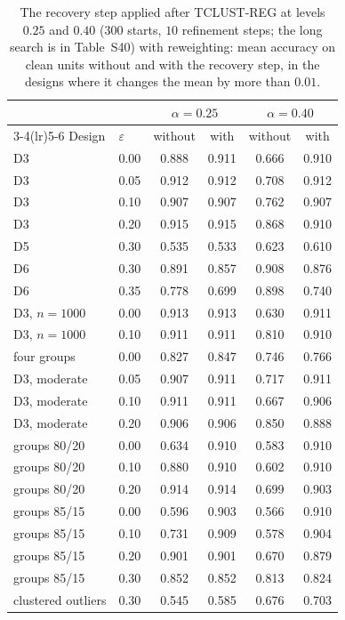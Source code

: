 \begin{table}[htbp]
\centering
\small
\caption{The recovery step applied after TCLUST-REG at levels $0.25$ and $0.40$ ($300$ starts, $10$ refinement steps; the long search is in Table~S40) with reweighting: mean accuracy on clean units without and with the recovery step, in the designs where it changes the mean by more than $0.01$.}
\label{tab:S17}
\begin{tabular}{llcccc}
\toprule
 & & \multicolumn{2}{c}{$\alpha=0.25$} & \multicolumn{2}{c}{$\alpha=0.40$} \\
\cmidrule(lr){3-4}\cmidrule(lr){5-6}
Design & $\varepsilon$ & without & with & without & with \\
\midrule
D3 & 0.00 & 0.888 & 0.911 & 0.666 & 0.910 \\
D3 & 0.05 & 0.912 & 0.912 & 0.708 & 0.912 \\
D3 & 0.10 & 0.907 & 0.907 & 0.762 & 0.907 \\
D3 & 0.20 & 0.915 & 0.915 & 0.868 & 0.910 \\
D5 & 0.30 & 0.535 & 0.533 & 0.623 & 0.610 \\
D6 & 0.30 & 0.891 & 0.857 & 0.908 & 0.876 \\
D6 & 0.35 & 0.778 & 0.699 & 0.898 & 0.740 \\
D3, $n=1000$ & 0.00 & 0.913 & 0.913 & 0.630 & 0.911 \\
D3, $n=1000$ & 0.10 & 0.911 & 0.911 & 0.810 & 0.910 \\
four groups & 0.00 & 0.827 & 0.847 & 0.746 & 0.766 \\
D3, moderate & 0.05 & 0.907 & 0.911 & 0.717 & 0.911 \\
D3, moderate & 0.10 & 0.911 & 0.911 & 0.667 & 0.906 \\
D3, moderate & 0.20 & 0.906 & 0.906 & 0.850 & 0.888 \\
groups 80/20 & 0.00 & 0.634 & 0.910 & 0.583 & 0.910 \\
groups 80/20 & 0.10 & 0.880 & 0.910 & 0.602 & 0.910 \\
groups 80/20 & 0.20 & 0.914 & 0.914 & 0.699 & 0.903 \\
groups 85/15 & 0.00 & 0.596 & 0.903 & 0.566 & 0.910 \\
groups 85/15 & 0.10 & 0.731 & 0.909 & 0.578 & 0.904 \\
groups 85/15 & 0.20 & 0.901 & 0.901 & 0.670 & 0.879 \\
groups 85/15 & 0.30 & 0.852 & 0.852 & 0.813 & 0.824 \\
clustered outliers & 0.30 & 0.545 & 0.585 & 0.676 & 0.703 \\
\bottomrule
\end{tabular}
\end{table}